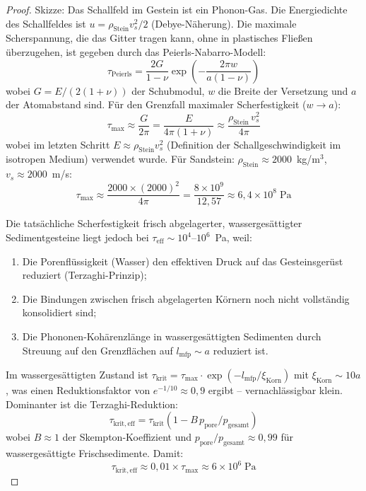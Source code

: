 ﻿\documentclass[12pt,a4paper]{report}
\begin{document}
\begin{proof}
	Skizze: Das Schallfeld im Gestein ist ein Phonon-Gas. Die Energiedichte des Schallfeldes ist $u = \rho_\mathrm{Stein} v_s^2/2$ (Debye-Näherung). Die maximale Scherspannung, die das Gitter tragen kann, ohne in plastisches Fließen überzugehen, ist gegeben durch das Peierls-Nabarro-Modell:
	\begin{equation}
		\tau_\mathrm{Peierls} = \frac{2G}{1-\nu}\exp\!\left(-\frac{2\pi w}{a(1-\nu)}\right)
		\label{eq:peierls}
	\end{equation}
	wobei $G = E/(2(1+\nu))$ der Schubmodul, $w$ die Breite der Versetzung und $a$ der Atomabstand sind. Für den Grenzfall maximaler Scherfestigkeit ($w \to a$):
	\begin{equation}
		\tau_\mathrm{max} \approx \frac{G}{2\pi} = \frac{E}{4\pi(1+\nu)} \approx \frac{\rho_\mathrm{Stein}\,v_s^2}{4\pi}
		\label{eq:tau_max_peierls}
	\end{equation}
	wobei im letzten Schritt $E \approx \rho_\mathrm{Stein} v_s^2$ (Definition der Schallgeschwindigkeit im isotropen Medium) verwendet wurde. Für Sandstein: $\rho_\mathrm{Stein} \approx 2000$~kg/m$^3$, $v_s \approx 2000$~m/s:
	\begin{equation}
		\tau_\mathrm{max} \approx \frac{2000\times(2000)^2}{4\pi} = \frac{8\times10^9}{12{,}57} \approx 6{,}4\times10^8\;\text{Pa}
		\label{eq:tau_max_sandstein}
	\end{equation}
	
	Die tatsächliche Scherfestigkeit frisch abgelagerter, wassergesättigter Sedimentgesteine liegt jedoch bei $\tau_\mathrm{eff} \sim 10^4$--$10^6$~Pa, weil:
	\begin{enumerate}
		\item Die Porenflüssigkeit (Wasser) den effektiven Druck auf das Gesteinsgerüst reduziert (Terzaghi-Prinzip);
		\item Die Bindungen zwischen frisch abgelagerten Körnern noch nicht vollständig konsolidiert sind;
		\item Die Phononen-Kohärenzlänge in wassergesättigten Sedimenten durch Streuung auf den Grenzflächen auf $l_\mathrm{mfp} \sim a$ reduziert ist.
	\end{enumerate}
	
	Im wassergesättigten Zustand ist $\tau_\mathrm{krit} = \tau_\mathrm{max}\cdot\exp(-l_\mathrm{mfp}/\xi_\mathrm{Korn})$ mit $\xi_\mathrm{Korn} \sim 10a$, was einen Reduktionsfaktor von $e^{-1/10} \approx 0{,}9$ ergibt -- vernachlässigbar klein. Dominanter ist die Terzaghi-Reduktion:
	\begin{equation}
		\tau_\mathrm{krit,eff} = \tau_\mathrm{krit}(1 - B\,p_\mathrm{pore}/p_\mathrm{gesamt})
		\label{eq:terzaghi}
	\end{equation}
	wobei $B \approx 1$ der Skempton-Koeffizient und $p_\mathrm{pore}/p_\mathrm{gesamt} \approx 0{,}99$ für wassergesättigte Frischsedimente. Damit:
	\begin{equation}
		\tau_\mathrm{krit,eff} \approx 0{,}01\times\tau_\mathrm{max} \approx 6\times10^6\;\text{Pa}
		\label{eq:tau_krit_eff_numerisch}
	\end{equation}
	

\end{proof}
\end{document}
